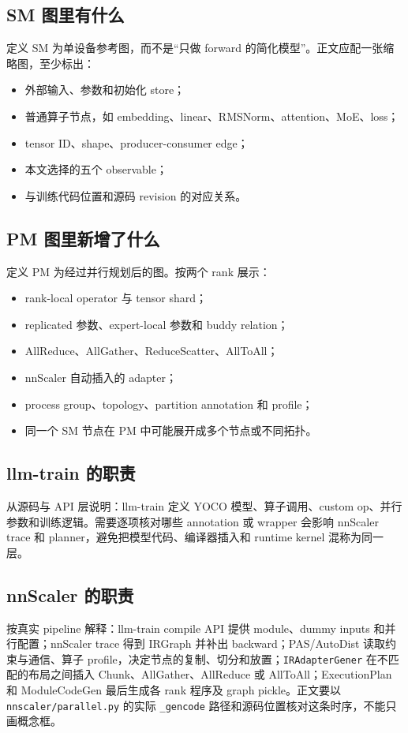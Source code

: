 \documentclass[11pt,a4paper]{ctexart}
\begin{document}
\subsection{SM 图里有什么}
定义 SM 为单设备参考图，而不是“只做 forward 的简化模型”。正文应配一张缩略图，至少标出：
\begin{itemize}
  \item 外部输入、参数和初始化 store；
  \item 普通算子节点，如 embedding、linear、RMSNorm、attention、MoE、loss；
  \item tensor ID、shape、producer-consumer edge；
  \item 本文选择的五个 observable；
  \item 与训练代码位置和源码 revision 的对应关系。
\end{itemize}

\subsection{PM 图里新增了什么}
定义 PM 为经过并行规划后的图。按两个 rank 展示：
\begin{itemize}
  \item rank-local operator 与 tensor shard；
  \item replicated 参数、expert-local 参数和 buddy relation；
  \item AllReduce、AllGather、ReduceScatter、AllToAll；
  \item nnScaler 自动插入的 adapter；
  \item process group、topology、partition annotation 和 profile；
  \item 同一个 SM 节点在 PM 中可能展开成多个节点或不同拓扑。
\end{itemize}

\subsection{llm-train 的职责}
从源码与 API 层说明：llm-train 定义 YOCO 模型、算子调用、custom op、并行参数和训练逻辑。需要逐项核对哪些 annotation 或 wrapper 会影响 nnScaler trace 和 planner，避免把模型代码、编译器插入和 runtime kernel 混称为同一层。

\subsection{nnScaler 的职责}
按真实 pipeline 解释：llm-train compile API 提供 module、dummy inputs 和并行配置；nnScaler trace 得到 IRGraph 并补出 backward；PAS/AutoDist 读取约束与通信、算子 profile，决定节点的复制、切分和放置；\texttt{IRAdapterGener} 在不匹配的布局之间插入 Chunk、AllGather、AllReduce 或 AllToAll；ExecutionPlan 和 ModuleCodeGen 最后生成各 rank 程序及 graph pickle。正文要以 \texttt{nnscaler/parallel.py} 的实际 \texttt{\_gencode} 路径和源码位置核对这条时序，不能只画概念框。
\end{document}
